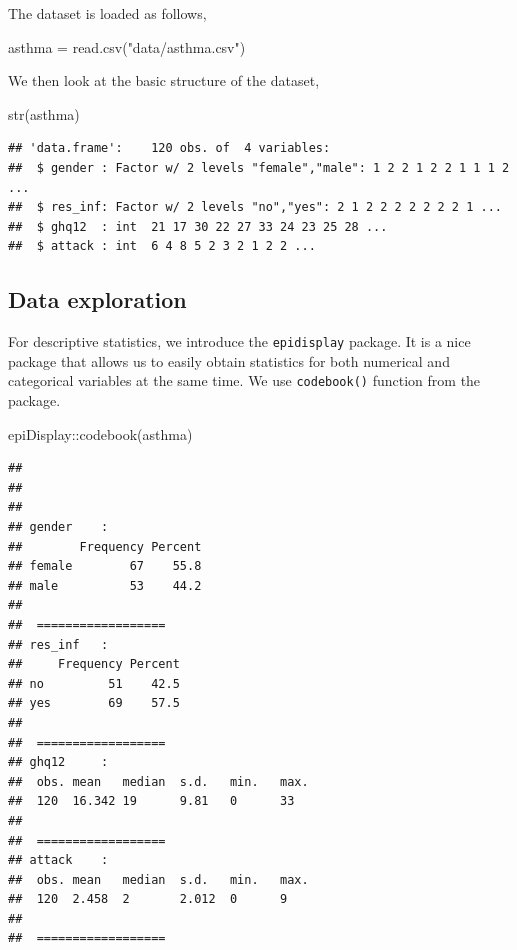 \documentclass[
  10pt,
]{krantz}
\newenvironment{Shaded}{\begin{snugshade}}{\end{snugshade}}
\newcommand{\FunctionTok}[1]{\textcolor[rgb]{0.00,0.00,0.00}{#1}}
\newcommand{\NormalTok}[1]{#1}
\newcommand{\OtherTok}[1]{\textcolor[rgb]{0.56,0.35,0.01}{#1}}
\newcommand{\SpecialCharTok}[1]{\textcolor[rgb]{0.00,0.00,0.00}{#1}}
\newcommand{\StringTok}[1]{\textcolor[rgb]{0.31,0.60,0.02}{#1}}
\begin{document}
The dataset is loaded as follows,

\begin{Shaded}
\begin{Highlighting}[]
\NormalTok{asthma }\OtherTok{=} \FunctionTok{read.csv}\NormalTok{(}\StringTok{"data/asthma.csv"}\NormalTok{)}
\end{Highlighting}
\end{Shaded}

We then look at the basic structure of the dataset,

\begin{Shaded}
\begin{Highlighting}[]
\FunctionTok{str}\NormalTok{(asthma)}
\end{Highlighting}
\end{Shaded}

\begin{verbatim}
## 'data.frame':    120 obs. of  4 variables:
##  $ gender : Factor w/ 2 levels "female","male": 1 2 2 1 2 2 1 1 1 2 ...
##  $ res_inf: Factor w/ 2 levels "no","yes": 2 1 2 2 2 2 2 2 2 1 ...
##  $ ghq12  : int  21 17 30 22 27 33 24 23 25 28 ...
##  $ attack : int  6 4 8 5 2 3 2 1 2 2 ...
\end{verbatim}

\hypertarget{data-exploration-2}{%
\subsection{Data exploration}\label{data-exploration-2}}

For descriptive statistics, we introduce the \texttt{epidisplay} package. It is a nice package that allows us to easily obtain statistics for both numerical and categorical variables at the same time. We use \texttt{codebook()} function from the package.

\begin{Shaded}
\begin{Highlighting}[]
\NormalTok{epiDisplay}\SpecialCharTok{::}\FunctionTok{codebook}\NormalTok{(asthma)}
\end{Highlighting}
\end{Shaded}

\begin{verbatim}
## 
##  
##  
## gender    :    
##        Frequency Percent
## female        67    55.8
## male          53    44.2
## 
##  ================== 
## res_inf   :    
##     Frequency Percent
## no         51    42.5
## yes        69    57.5
## 
##  ================== 
## ghq12     :    
##  obs. mean   median  s.d.   min.   max.  
##  120  16.342 19      9.81   0      33    
## 
##  ================== 
## attack    :    
##  obs. mean   median  s.d.   min.   max.  
##  120  2.458  2       2.012  0      9     
## 
##  ==================
\end{verbatim}
\end{document}
